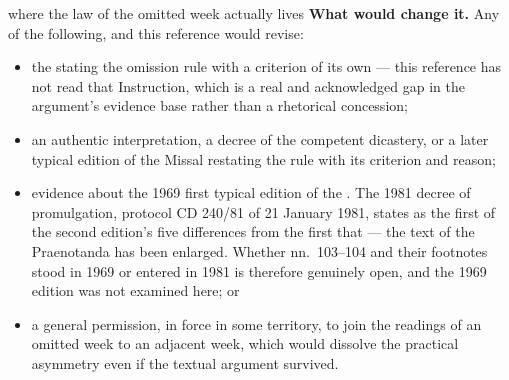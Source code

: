 \begin{synthesis}{where the law of the omitted week actually lives}
\textbf{What would change it.} Any of the following, and this reference would revise:

\begin{itemize}
\item the  stating the omission rule with a criterion
of its own --- this reference has not read that Instruction, which is a real and acknowledged gap in
the argument's evidence base rather than a rhetorical concession;
\item an authentic interpretation, a decree of the competent dicastery, or a later typical edition of
the Missal restating the rule with its criterion and reason;
\item evidence about the 1969 first typical edition of the . The 1981
decree of promulgation, protocol CD 240/81 of 21 January 1981, states as the first of the second
edition's five differences from the first that  --- the
text of the Praenotanda has been enlarged. Whether nn.~103--104 and their footnotes stood in 1969 or
entered in 1981 is therefore genuinely open, and the 1969 edition was not examined here; or
\item a general permission, in force in some territory, to join the readings of an omitted week to an
adjacent week, which would dissolve the practical asymmetry even if the textual argument survived.
\end{itemize}
\end{synthesis}

